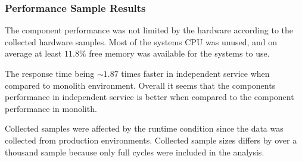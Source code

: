 \subsubsection{Performance Sample Results}
The component performance was not limited by the hardware according to the collected hardware samples.
Most of the systems CPU was unused, and on average at least $11.8\%$ free memory was available for the systems to use.

The response time being $\sim 1.87$ times faster in independent service when compared to monolith environment.
Overall it seems that the components performance in independent service is better when compared to the component performance in monolith.

Collected samples were affected by the runtime condition since the data was collected from production environments.
Collected sample sizes differs by over a thousand sample because only full cycles were included in the analysis.
